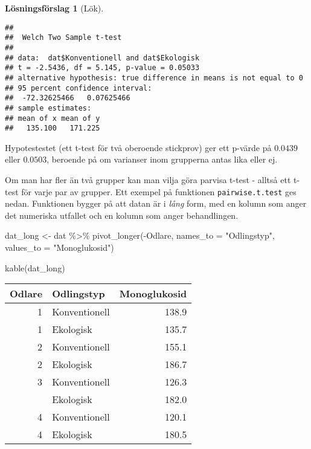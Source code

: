 \documentclass[
]{book}
\newenvironment{Shaded}{\begin{snugshade}}{\end{snugshade}}
\newcommand{\AttributeTok}[1]{\textcolor[rgb]{0.77,0.63,0.00}{#1}}
\newcommand{\FunctionTok}[1]{\textcolor[rgb]{0.00,0.00,0.00}{#1}}
\newcommand{\NormalTok}[1]{#1}
\newcommand{\OtherTok}[1]{\textcolor[rgb]{0.56,0.35,0.01}{#1}}
\newcommand{\SpecialCharTok}[1]{\textcolor[rgb]{0.00,0.00,0.00}{#1}}
\newcommand{\StringTok}[1]{\textcolor[rgb]{0.31,0.60,0.02}{#1}}
\theoremstyle{definition}
\theoremstyle{definition}
\theoremstyle{definition}
\theoremstyle{definition}
\newtheorem{hypothesis}{Lösningsförslag}[chapter]
\theoremstyle{remark}
\begin{document}
\begin{hypothesis}[Lök]
\begin{Shaded}
\end{Shaded}

\begin{verbatim}
## 
##  Welch Two Sample t-test
## 
## data:  dat$Konventionell and dat$Ekologisk
## t = -2.5436, df = 5.145, p-value = 0.05033
## alternative hypothesis: true difference in means is not equal to 0
## 95 percent confidence interval:
##  -72.32625466   0.07625466
## sample estimates:
## mean of x mean of y 
##   135.100   171.225
\end{verbatim}

Hypotestestet (ett t-test för två oberoende stickprov) ger ett p-värde på \(0.0439\) eller \(0.0503\), beroende på om varianser inom grupperna antas lika eller ej.

Om man har fler än två grupper kan man vilja göra parvisa t-test - alltså ett t-test för varje par av grupper.
Ett exempel på funktionen \texttt{pairwise.t.test} ges nedan. Funktionen bygger på att datan är i \emph{lång} form, med en kolumn som anger det numeriska utfallet och en kolumn som anger behandlingen.

\begin{Shaded}
\begin{Highlighting}[]
\NormalTok{dat\_long }\OtherTok{\textless{}{-}}\NormalTok{ dat }\SpecialCharTok{\%\textgreater{}\%} 
  \FunctionTok{pivot\_longer}\NormalTok{(}\SpecialCharTok{{-}}\NormalTok{Odlare, }\AttributeTok{names\_to =} \StringTok{"Odlingstyp"}\NormalTok{, }
               \AttributeTok{values\_to =} \StringTok{"Monoglukosid"}\NormalTok{)}

\FunctionTok{kable}\NormalTok{(dat\_long)}
\end{Highlighting}
\end{Shaded}

\begin{table}
\centering
\begin{tabular}[t]{rlr}
\toprule
Odlare & Odlingstyp & Monoglukosid\\
\midrule
1 & Konventionell & 138.9\\
1 & Ekologisk & 135.7\\
2 & Konventionell & 155.1\\
2 & Ekologisk & 186.7\\
3 & Konventionell & 126.3\\
\addlinespace
3 & Ekologisk & 182.0\\
4 & Konventionell & 120.1\\
4 & Ekologisk & 180.5\\
\bottomrule
\end{tabular}
\end{table}


\end{hypothesis}
\end{document}
